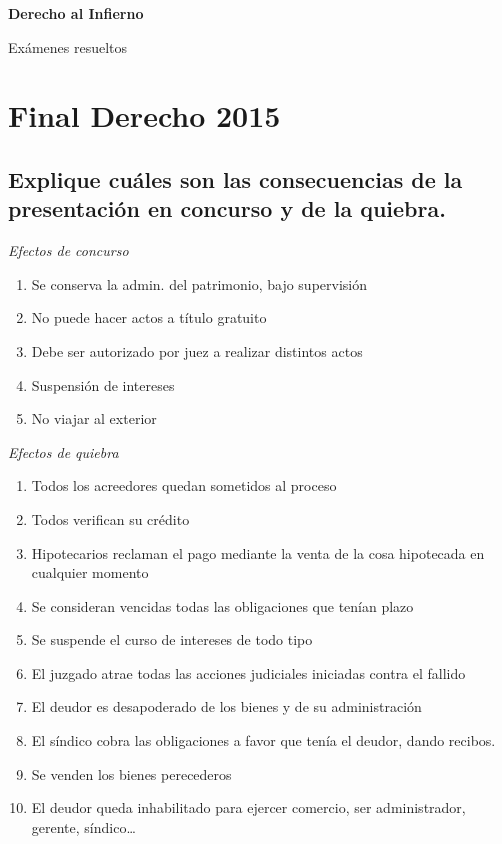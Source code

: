 \documentclass{article}
\begin{document}
{
\centering
{\Huge \bf \sc Derecho al Infierno\par}
\vspace{.1cm}
{\large Exámenes resueltos \par}
}
\pagestyle{plain}
\tableofcontents

\clearpage
\section{Final Derecho 2015}
\pagestyle{fancy}
\subsection{Explique cuáles son las consecuencias de la presentación en concurso y de la quiebra.}
\label{sec:ConsecuenciasConcursoQuiebra}

\textit{Efectos de concurso}
\begin{enumerate}
\item Se conserva la admin. del patrimonio, bajo supervisión
\item No puede hacer actos a título gratuito
\item Debe ser autorizado por juez a realizar distintos actos
\item Suspensión de intereses
\item No viajar al exterior
\end{enumerate}
\textit{Efectos de quiebra}
\begin{enumerate}
\item Todos los acreedores quedan sometidos al proceso
\item Todos verifican su crédito
\item Hipotecarios reclaman el pago mediante la venta de la cosa hipotecada en cualquier momento
\item Se consideran vencidas todas las obligaciones que tenían plazo
\item Se suspende el curso de intereses de todo tipo
\item El juzgado atrae todas las acciones judiciales iniciadas contra el fallido
\item El deudor es desapoderado de los bienes y de su administración
\item El síndico cobra las obligaciones a favor que tenía el deudor, dando recibos.
\item Se venden los bienes perecederos
\item El deudor queda inhabilitado para ejercer comercio, ser administrador, gerente, síndico…
\end{enumerate}
\end{document}

